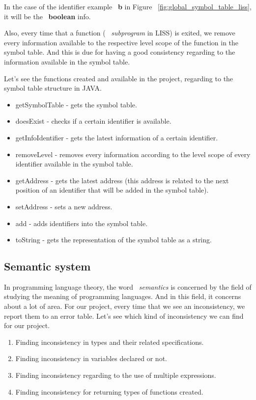 \documentclass[
  oneside,
  11pt, a4paper,
  footinclude=true,
  headinclude=true,
  cleardoublepage=empty
]{scrbook}
\begin{document}
In the case of the identifier example ~\textbf{b} in Figure ~\ref{fig:global_symbol_table_liss}, it will be the ~\textbf{boolean} info.



Also, every time that a function ( ~\textit{subprogram} in LISS) is exited, we remove every information  available to the respective level scope of the function in the symbol table. And this is due for having a good consistency regarding to the information available in the symbol table.

Let's see the functions created and available in the project, regarding to the symbol table structure in JAVA.

\begin{itemize}
\item getSymbolTable - gets the symbol table.
\item doesExist - checks if a certain identifier is available.
\item getInfoIdentifier - gets the latest information of a certain identifier.
\item removeLevel - removes every information according to the level scope of every identifier available in the symbol table.
\item getAddress - gets the latest address (this address is related to the next position of an identifier that will be added in the symbol table).
\item setAddress - sets a new address.
\item add - adds identifiers into the symbol table.
\item toString - gets the representation of the symbol table as a string.
\end{itemize}

\subsection{Semantic system}

In programming language theory, the word ~\textit{semantics} is concerned by the field of studying the meaning of programming languages.
And in this field, it concerns about a lot of area.
For our project, every time that we see an inconsistency, we report them to an error table.
Let's see which kind of inconsistency we can find for our project.

\begin{enumerate}
\item Finding inconsistency in types and their related specifications.
\item Finding inconsistency in variables declared or not.
\item Finding inconsistency regarding to the use of multiple expressions.
\item Finding inconsistency for returning types of functions created.
\end{enumerate}
\end{document}
